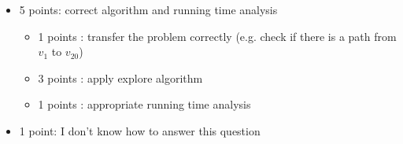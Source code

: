 \documentclass[11pt]{article}
\begin{document}
\begin{qunlist}
\begin{itemize}
    \item 5 points: correct algorithm and running time analysis
    \begin{itemize}
        \item 1 points : transfer the problem correctly (e.g. check if there is a path from $v_1$ to $v_{20}$)
        \item 3 points : apply explore algorithm
        \item 1 points : appropriate running time analysis
    \end{itemize}
    
    \item 1 point: I don't know how to answer this question
\end{itemize}

\end{qunlist}
\end{document}
